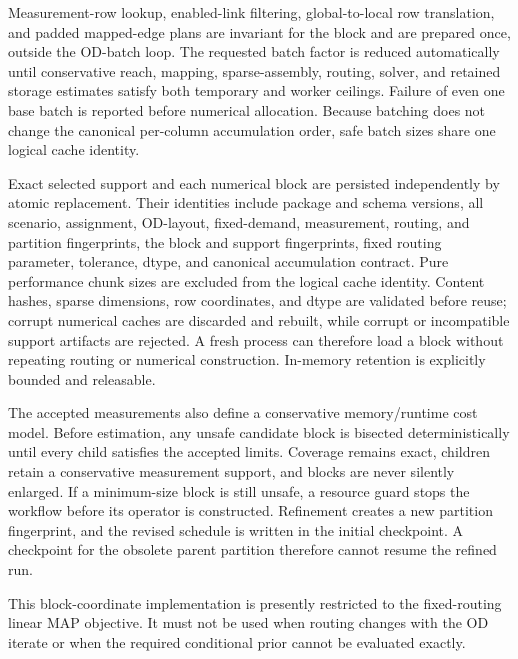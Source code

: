 Measurement-row lookup, enabled-link filtering, global-to-local row translation,
and padded mapped-edge plans are invariant for the block and are prepared once,
outside the OD-batch loop. The requested batch factor is reduced automatically
until conservative reach, mapping, sparse-assembly, routing, solver, and retained
storage estimates satisfy both temporary and worker ceilings. Failure of even
one base batch is reported before numerical allocation. Because batching does
not change the canonical per-column accumulation order, safe batch sizes share
one logical cache identity.

Exact selected support and each numerical block are persisted independently by
atomic replacement.  Their identities include package and schema versions,
all scenario, assignment, OD-layout, fixed-demand, measurement, routing, and
partition fingerprints, the block and support fingerprints, fixed routing
parameter, tolerance, dtype, and canonical accumulation contract. Pure
performance chunk sizes are excluded from the logical cache identity. Content
hashes, sparse dimensions, row coordinates, and dtype are validated before
reuse; corrupt numerical caches are discarded and rebuilt, while corrupt or
incompatible support artifacts are rejected.  A fresh process can therefore
load a block without repeating routing or numerical construction.  In-memory
retention is explicitly bounded and releasable.

The accepted measurements also define a conservative memory/runtime cost model.
Before estimation, any unsafe candidate block is bisected deterministically
until every child satisfies the accepted limits.  Coverage remains exact,
children retain a conservative measurement support, and blocks are never
silently enlarged.  If a minimum-size block is still unsafe, a resource guard
stops the workflow before its operator is constructed.  Refinement creates a
new partition fingerprint, and the revised schedule is written in the initial
checkpoint.  A checkpoint for the obsolete parent partition therefore cannot
resume the refined run.

This block-coordinate implementation is presently restricted to the
fixed-routing linear MAP objective.  It must not be used when routing changes
with the OD iterate or when the required conditional prior cannot be evaluated
exactly.

